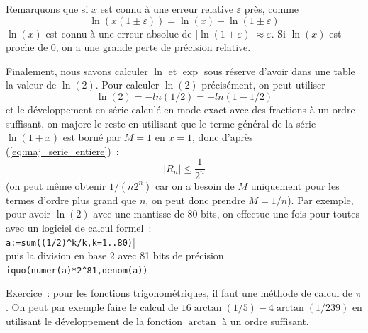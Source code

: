 \documentclass[a4paper,11pt]{article}
\begin{document}
\begin{giacjshere}
Remarquons que si $x$ est connu \`a une erreur relative $\varepsilon$
pr\`es, comme
\[ \ln(x(1 \pm \varepsilon))=\ln(x) + \ln(1 \pm \varepsilon) \]
$\ln(x)$ est connu \`a une erreur absolue de 
$|\ln(1 \pm \varepsilon)| \approx \varepsilon$. Si $\ln(x)$ est proche
de 0, on a une grande perte de pr\'ecision relative.

Finalement, nous savons calculer $\ln$ et $\exp$ sous r\'eserve
d'avoir dans une table la valeur de $\ln(2)$. Pour calculer
$\ln(2)$ pr\'ecis\'ement, on peut utiliser
\[ \ln(2)=-ln(1/2)=-ln(1-1/2) \]
et le d\'eveloppement en s\'erie calcul\'e en mode exact avec des
fractions \`a un ordre suffisant, on majore le reste en utilisant 
que le terme g\'en\'eral de la s\'erie $\ln(1+x)$ est born\'e par
$M=1$ en $x=1$, donc d'apr\`es (\ref{eq:maj_serie_entiere})~:
\[ |R_n| \leq \frac{1}{2^n}\]
(on peut m\^eme obtenir $1/(n2^n)$ car on a besoin de $M$ uniquement
pour les termes d'ordre plus grand que $n$, on peut donc prendre $M=1/n$).
Par exemple, pour avoir $\ln(2)$ avec une mantisse de 80 bits,
on effectue une fois pour toutes avec un logiciel
de calcul formel~:\\
\verb|a:=sum((1/2)^k/k,k=1..80)||\\
puis la division en base 2 avec 81 bits de pr\'ecision
\verb|iquo(numer(a)*2^81,denom(a))|

Exercice~: pour les fonctions trigonom\'etriques, il faut une
m\'ethode de calcul de $\pi$. On peut par exemple faire le calcul
de $16 \arctan(1/5)-4\arctan(1/239)$ en utilisant le d\'eveloppement
de la fonction $\arctan$ \`a un ordre suffisant.


\end{giacjshere}
\end{document}
